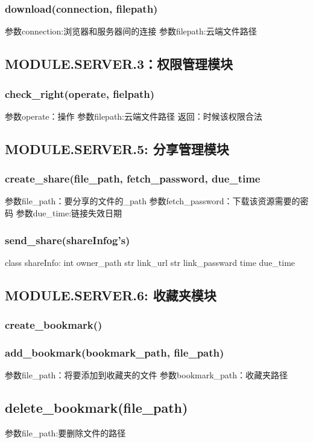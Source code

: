 \subsubsection{download(connection, filepath)}
参数connection:浏览器和服务器间的连接
参数filepath:云端文件路径

\subsection{MODULE.SERVER.3：权限管理模块}
\subsubsection{check\_right(operate, fielpath)}
参数operate：操作
参数filepath:云端文件路径
返回：时候该权限合法


\subsection{MODULE.SERVER.5: 分享管理模块}
\subsubsection{create\_share(file\_path, fetch\_password, due\_time}
参数file\_path：要分享的文件的\_path
参数fetch\_password：下载该资源需要的密码
参数due\_time:链接失效日期

\subsubsection{send\_share(shareInfog's)}
class shareInfo:
    int owner\_path
    str link\_url
    str link\_passward
    time due\_time

\subsection{MODULE.SERVER.6: 收藏夹模块}

\subsubsection{create\_bookmark()}

\subsubsection{add\_bookmark(bookmark\_path, file\_path)}
参数file\_path：将要添加到收藏夹的文件
参数bookmark\_path：收藏夹路径

\subsection{delete\_bookmark(file\_path)}
参数file\_path:要删除文件的路径

